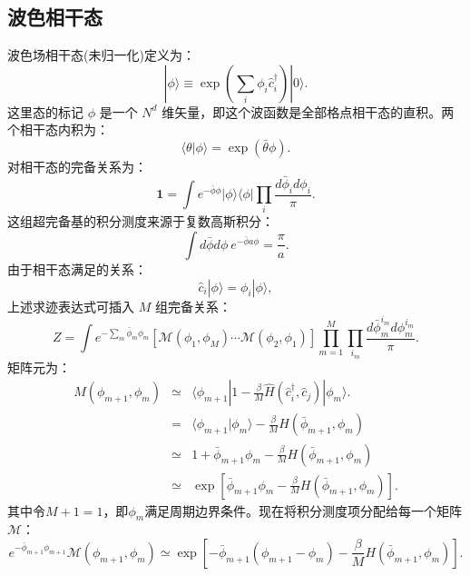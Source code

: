 \documentclass[UTF8]{ctexart}
\begin{document}
\subsection*{波色相干态}
\noindent 波色场相干态(未归一化)定义为：
\begin{equation}
	|\phi\rangle \equiv \exp\left(\sum_i \phi_i \hat c_i^\dagger \right)|0\rangle.
\end{equation}
这里态的标记 $\phi$ 是一个 $N^d$ 维矢量，即这个波函数是全部格点相干态的直积。两个相干态内积为：
\begin{equation}
	\langle \theta | \phi \rangle = \exp\left(\bar\theta \phi \right).
\end{equation}
对相干态的完备关系为：
\begin{equation}
	\bm 1 = \int e^{-\bar\phi\phi} |\phi\rangle \langle \phi| \prod_i \frac{d\bar\phi_i d\phi_i}{\pi}.
\end{equation}
这组超完备基的积分测度来源于复数高斯积分：
\begin{equation}
	\int d\bar\phi d\phi\ e^{-\bar\phi a \phi} = \frac{\pi}{a}.
\end{equation}
由于相干态满足的关系：
\begin{equation}
	\hat c_i |\phi \rangle = \phi_i |\phi \rangle,
\end{equation}
上述求迹表达式可插入 $M$ 组完备关系：
\begin{equation}
	Z = \int e^{-\sum_m \bar\phi_m\phi_m }
		\left[ \mathcal M(\phi_{1},\phi_{M}) \cdots \mathcal M(\phi_{2},\phi_{1}) \right]
		\prod_{m=1}^{M}\prod_{i_m} \frac{d\bar\phi_{m}^{i_m} d\phi_{m}^{i_m}}{\pi}.
\end{equation}
矩阵元为：
\begin{eqnarray}
	M(\phi_{m+1},\phi_{m}) 
	&\simeq & \langle \phi_{m+1}| 1-\frac{\beta}{M} \hat H(\hat c_i^\dagger, \hat c_j) |\phi_{m} \rangle. \nonumber \\
	&=& \langle \phi_{m+1}| \phi_{m} \rangle -\frac{\beta}{M} H(\bar\phi_{m+1}, \phi_m) \nonumber \\
	&\simeq & 1 + \bar\phi_{m+1}\phi_{m} - \frac{\beta}{M} H(\bar\phi_{m+1}, \phi_m) \nonumber \\
	&\simeq & \exp\left[\bar\phi_{m+1}\phi_{m} - \frac{\beta}{M} H(\bar\phi_{m+1}, \phi_m) \right].
\end{eqnarray}
其中令$M+1=1$，即$\phi_m$满足周期边界条件。现在将积分测度项分配给每一个矩阵$\mathcal M$：
\begin{equation}
	e^{-\bar\phi_{m+1}\phi_{m+1}}\mathcal M(\phi_{m+1},\phi_m)
	\simeq \exp\left[-\bar\phi_{m+1}(\phi_{m+1}-\phi_m) - \frac{\beta}{M} H(\bar\phi_{m+1}, \phi_m) \right].
\end{equation}
\end{document}
